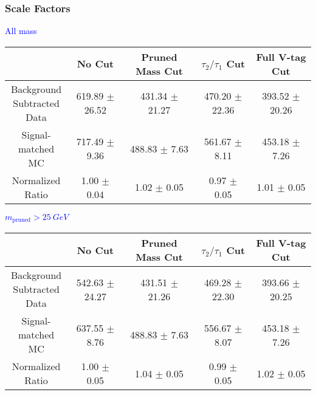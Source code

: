 \documentclass{beamer}
\begin{document}
\begin{frame}
  \frametitle{Scale Factors}
  \begin{adjustwidth}{-1.5em}{-1.5em}
    \centering
    \vspace{6pt}
    \textcolor{blue}{All mass}
    \vspace{6pt}

    {\scriptsize
      \begin{tabular}{c | c | c | c | c}
        \hline
        & No Cut & Pruned Mass Cut & $\tau_2/\tau_1$ Cut & Full V-tag Cut \\
        \hline
        \makecell{Background \\ Subtracted \\ Data} & 619.89 $\pm$ 26.52 & 431.34 $\pm$ 21.27 & 470.20 $\pm$ 22.36 & 393.52 $\pm$ 20.26 \\
        \makecell{Signal-\\ matched MC} & 717.49 $\pm$ 9.36 & 488.83 $\pm$ 7.63 & 561.67 $\pm$ 8.11 & 453.18 $\pm$ 7.26 \\
        \hline
        \makecell{Normalized \\ Ratio} & 1.00 $\pm$ 0.04 & 1.02 $\pm$ 0.05 & 0.97 $\pm$ 0.05 & 1.01 $\pm$ 0.05 \\
        \hline
    \end{tabular}
    }

    \vspace{6pt}
    \textcolor{blue}{$m_\text{pruned} > \SI{25}{GeV}$}
    \vspace{6pt}

    {\scriptsize
      \begin{tabular}{c | c | c | c | c}
        \hline
        & No Cut & Pruned Mass Cut & $\tau_2/\tau_1$ Cut & Full V-tag Cut \\
        \hline
        \makecell{Background \\ Subtracted \\ Data} & 542.63 $\pm$ 24.27 & 431.51 $\pm$ 21.26 & 469.28 $\pm$ 22.30 & 393.66 $\pm$ 20.25 \\
        \makecell{Signal-\\ matched MC} & 637.55 $\pm$ 8.76 & 488.83 $\pm$ 7.63 & 556.67 $\pm$ 8.07 & 453.18 $\pm$ 7.26 \\
        \hline
        \makecell{Normalized \\ Ratio} & 1.00 $\pm$ 0.05 & 1.04 $\pm$ 0.05 & 0.99 $\pm$ 0.05 & 1.02 $\pm$ 0.05 \\
        \hline
      \end{tabular}
    }
  \end{adjustwidth}
\end{frame}
\end{document}
